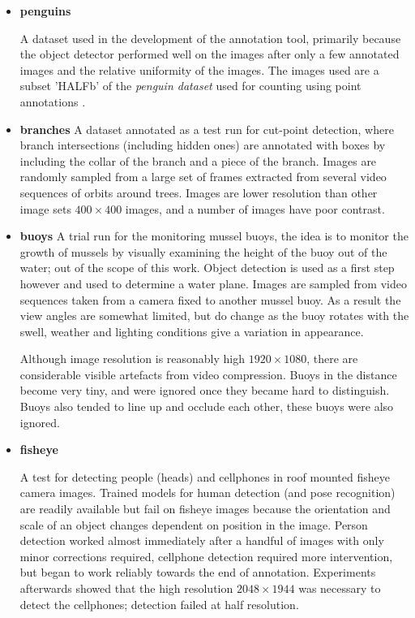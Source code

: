 \begin{itemize}
    \item{\bf{penguins}}\par
A dataset used in the development of the annotation tool, primarily because the object detector performed well on the images after only a few annotated images and the relative uniformity of the images. The images used are a subset 'HALFb'  of the \emph{penguin dataset} \cite{PenguinData} used for counting using point annotations \cite{Arteta2016}. 
    \item{\bf{branches}}
A dataset annotated as a test run for cut-point detection, where branch intersections (including hidden ones) are annotated with boxes by including the collar of the branch and a piece of the branch. Images are randomly sampled from a large set of frames extracted from several video sequences of orbits around trees. Images are lower resolution than other image sets $ 400\times400 $ images, and a number of images have poor contrast.

    \item{\bf{buoys}}
A trial run for the monitoring mussel buoys, the idea is to monitor the growth of mussels by visually examining the height of the buoy out of the water; out of the scope of this work. Object detection is used as a first step however and used to determine a water plane. Images are sampled from video sequences taken from a camera fixed to another mussel buoy. As a result the view angles are somewhat limited, but do change as the buoy rotates with the swell, weather and lighting conditions give a variation in appearance. 

Although image resolution is reasonably high $1920\times1080$, there are considerable visible artefacts from video compression. Buoys in the distance become very tiny, and were ignored once they became hard to distinguish. Buoys also tended to line up and occlude each other, these buoys were also ignored.


    \item{\bf{fisheye}}
    
A test for detecting people (heads) and cellphones in roof mounted fisheye camera images. Trained models for human detection (and pose recognition) are readily available but fail on fisheye images because the orientation and scale of an object changes dependent on position in the image. Person detection worked almost immediately after a handful of images with only minor corrections required, cellphone detection required more intervention, but began to work reliably towards the end of annotation. Experiments afterwards showed that the high resolution $2048\times1944$ was necessary to detect the cellphones; detection failed at half resolution.


\end{itemize}
